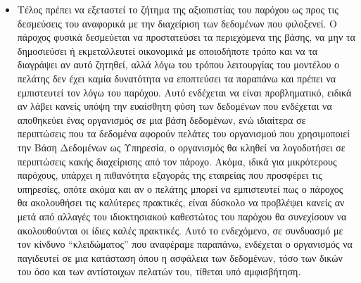\documentclass{article}
\begin{document}
\begin{itemize}
\item Τέλος πρέπει να εξεταστεί το ζήτημα της αξιοπιστίας του παρόχου ως προς τις δεσμεύσεις του αναφορικά με την διαχείριση των δεδομένων που φιλοξενεί. Ο πάροχος φυσικά δεσμεύεται να προστατεύσει τα περιεχόμενα της βάσης, να μην τα δημοσιεύσει ή εκμεταλλευτεί οικονομικά με οποιοδήποτε τρόπο και να τα διαγράψει αν αυτό ζητηθεί, αλλά λόγω του τρόπου λειτουργίας του μοντέλου ο πελάτης δεν έχει καμία δυνατότητα να εποπτεύσει τα παραπάνω και πρέπει να εμπιστευτεί τον λόγω του παρόχου. Αυτό ενδέχεται να είναι προβληματικό, ειδικά αν λάβει κανείς υπόψη την ευαίσθητη φύση των δεδομένων που ενδέχεται να αποθηκεύει ένας οργανισμός σε μια βάση δεδομένων, ενώ ιδιαίτερα σε περιπτώσεις που τα δεδομένα αφορούν πελάτες του οργανισμού που χρησιμοποιεί την Βάση Δεδομένων ως Υπηρεσία, ο οργανισμός θα κληθεί να λογοδοτήσει σε περιπτώσεις κακής διαχείρισης από τον πάροχο. Ακόμα, ιδικά για μικρότερους παρόχους, υπάρχει η πιθανότητα εξαγοράς της εταιρείας που προσφέρει τις υπηρεσίες, οπότε ακόμα και αν ο πελάτης μπορεί να εμπιστευτεί πως ο πάροχος θα ακολουθήσει τις καλύτερες πρακτικές, είναι δύσκολο να προβλέψει κανείς αν μετά από αλλαγές του ιδιοκτησιακού καθεστώτος του παρόχου θα συνεχίσουν να ακολουθούνται οι ίδιες καλές πρακτικές. Αυτό το ενδεχόμενο, σε συνδυασμό με τον κίνδυνο “κλειδώματος” που αναφέραμε παραπάνω, ενδέχεται ο οργανισμός να παγιδευτεί σε μια κατάσταση όπου η ασφάλεια των δεδομένων, τόσο των δικών του όσο και των αντίστοιχων πελατών του, τίθεται υπό αμφισβήτηση.
\end{itemize}
\end{document}
